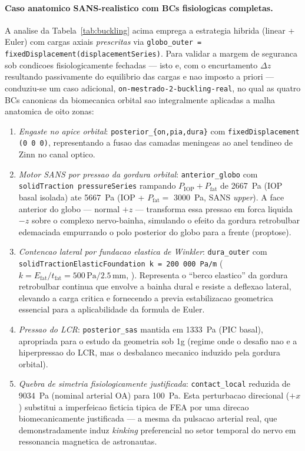 \paragraph{Caso anatomico SANS-realistico com BCs fisiologicas completas.} A analise da Tabela~\ref{tab:buckling} acima emprega a estrategia hibrida (linear + Euler) com cargas axiais \emph{prescritas} via \texttt{globo\_outer = fixedDisplacement(displacementSeries)}. Para validar a margem de seguranca sob condicoes fisiologicamente fechadas --- isto e, com o encurtamento $\Delta z$ resultando passivamente do equilibrio das cargas e nao imposto a priori --- conduziu-se um caso adicional, \texttt{on-mestrado-2-buckling-real}, no qual as quatro BCs canonicas da biomecanica orbital \citep{Lee2020NPJ, Pardon2024} sao integralmente aplicadas a malha anatomica de oito zonas:
\begin{enumerate}
\item \emph{Engaste no apice orbital}: \texttt{posterior\_\{on,pia,dura\}} com \texttt{fixedDisplacement (0 0 0)}, representando a fusao das camadas meningeas ao anel tendineo de Zinn no canal optico.
\item \emph{Motor SANS por pressao da gordura orbital}: \texttt{anterior\_globo} com \texttt{solidTraction pressureSeries} rampando $P_{\mathrm{IOP}} + P_{\mathrm{fat}}$ de \SI{2667}{\pascal} (IOP basal isolada) ate \SI{5667}{\pascal} (IOP + $P_{\mathrm{fat}} = $ \SI{3000}{\pascal}, SANS \emph{upper}). A face anterior do globo --- normal $+z$ --- transforma essa pressao em forca liquida $-z$ sobre o complexo nervo-bainha, simulando o efeito da gordura retrobulbar edemaciada empurrando o polo posterior do globo para a frente (proptose).
\item \emph{Contencao lateral por fundacao elastica de Winkler}: \texttt{dura\_outer} com \texttt{solidTractionElasticFoundation k = 200\,000 Pa/m} ($k = E_{\mathrm{fat}}/t_{\mathrm{fat}} = 500\,\si{\pascal} / 2.5\,\si{\milli\meter}$, \citet{Schoemaker2006, Yoo2011}). Representa o ``berco elastico'' da gordura retrobulbar continua que envolve a bainha dural e resiste a deflexao lateral, elevando a carga critica e fornecendo a previa estabilizacao geometrica essencial para a aplicabilidade da formula de Euler.
\item \emph{Pressao do LCR}: \texttt{posterior\_sas} mantida em \SI{1333}{\pascal} (PIC basal), apropriada para o estudo da geometria sob 1g (regime onde o desafio nao e a hiperpressao do LCR, mas o desbalanco mecanico induzido pela gordura orbital).
\item \emph{Quebra de simetria fisiologicamente justificada}: \texttt{contact\_local} reduzida de \SI{9034}{\pascal} (nominal arterial OA) para \SI{100}{\pascal}. Esta perturbacao direcional ($+x$) substitui a imperfeicao ficticia tipica de FEA por uma direcao biomecanicamente justificada --- a mesma da pulsacao arterial real, que demonstradamente induz \emph{kinking} preferencial no setor temporal do nervo em ressonancia magnetica de astronautas.
\end{enumerate}

